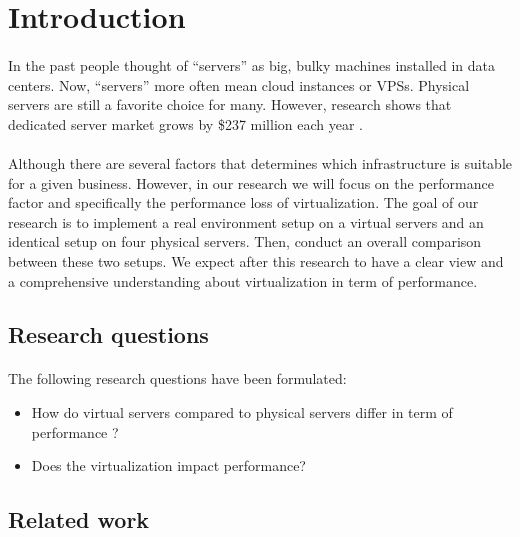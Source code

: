 \section{Introduction}
\paragraph{}
In the past people thought of “servers” as big, bulky machines installed in data centers. Now, “servers” more often mean cloud instances or VPSs. Physical servers are still a favorite choice for many. However, research shows that dedicated server market grows by \$237 million each year \cite{c1}. 
\paragraph{}
Although there are several factors that determines which infrastructure is suitable for a given business. However, in our research we will focus on the performance factor and specifically the performance loss of virtualization. The goal of our research is to implement a real environment setup on a virtual servers and an identical setup on four physical servers. Then, conduct an overall comparison between these two setups. We expect after this research to have a clear view and a comprehensive understanding about virtualization in term of performance. 
\subsection{Research questions}
\paragraph{}
The following research questions have been formulated:
\begin{itemize}
	\item How do virtual servers compared to physical servers differ in term of performance ?
	\item Does the virtualization impact performance?
\end{itemize}

\subsection{Related work}
\paragraph{}

